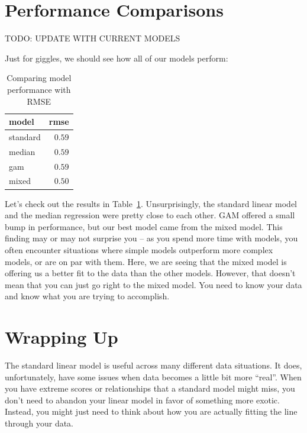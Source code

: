 \documentclass[
  letterpaper,
]{krantz}
\begin{document}
\section{Performance Comparisons}\label{performance-comparisons}

TODO: UPDATE WITH CURRENT MODELS

Just for giggles, we should see how all of our models perform:

\begin{longtable}{lr}

\caption{\label{tbl-model-performance-comp}Comparing model performance
with RMSE}

\tabularnewline

\toprule
model & rmse \\ 
\midrule\addlinespace[2.5pt]
standard & \textcolor[HTML]{404040}{$0.59$} \\ 
median & \textcolor[HTML]{404040}{$0.59$} \\ 
gam & \textcolor[HTML]{404040}{$0.59$} \\ 
mixed & \textcolor[HTML]{404040}{$0.50$} \\ 
\bottomrule

\end{longtable}

Let's check out the results in Table~\ref{tbl-model-performance-comp}.
Unsurprisingly, the standard linear model and the median regression were
pretty close to each other. GAM offered a small bump in performance, but
our best model came from the mixed model. This finding may or may not
surprise you -- as you spend more time with models, you often encounter
situations where simple models outperform more complex models, or are on
par with them. Here, we are seeing that the mixed model is offering us a
better fit to the data than the other models. However, that doesn't mean
that you can just go right to the mixed model. You need to know your
data and know what you are trying to accomplish.

\section{Wrapping Up}\label{sec-lm-extend-wrap}

The standard linear model is useful across many different data
situations. It does, unfortunately, have some issues when data becomes a
little bit more ``real''. When you have extreme scores or relationships
that a standard model might miss, you don't need to abandon your linear
model in favor of something more exotic. Instead, you might just need to
think about how you are actually fitting the line through your data.
\end{document}
